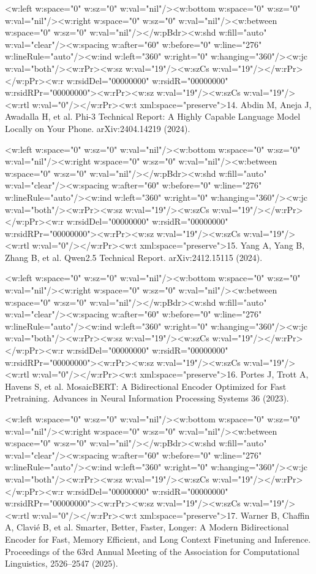 \documentclass[11pt]{article}
\begin{document}
<w:left w:space="0" w:sz="0" w:val="nil"/><w:bottom w:space="0" w:sz="0" w:val="nil"/><w:right w:space="0" w:sz="0" w:val="nil"/><w:between w:space="0" w:sz="0" w:val="nil"/></w:pBdr><w:shd w:fill="auto" w:val="clear"/><w:spacing w:after="60" w:before="0" w:line="276" w:lineRule="auto"/><w:ind w:left="360" w:right="0" w:hanging="360"/><w:jc w:val="both"/><w:rPr><w:sz w:val="19"/><w:szCs w:val="19"/></w:rPr></w:pPr><w:r w:rsidDel="00000000" w:rsidR="00000000" w:rsidRPr="00000000"><w:rPr><w:sz w:val="19"/><w:szCs w:val="19"/><w:rtl w:val="0"/></w:rPr><w:t xml:space="preserve">14. Abdin M, Aneja J, Awadalla H, et al. Phi-3 Technical Report: A Highly Capable Language Model Locally on Your Phone. arXiv:2404.14219 (2024).

<w:left w:space="0" w:sz="0" w:val="nil"/><w:bottom w:space="0" w:sz="0" w:val="nil"/><w:right w:space="0" w:sz="0" w:val="nil"/><w:between w:space="0" w:sz="0" w:val="nil"/></w:pBdr><w:shd w:fill="auto" w:val="clear"/><w:spacing w:after="60" w:before="0" w:line="276" w:lineRule="auto"/><w:ind w:left="360" w:right="0" w:hanging="360"/><w:jc w:val="both"/><w:rPr><w:sz w:val="19"/><w:szCs w:val="19"/></w:rPr></w:pPr><w:r w:rsidDel="00000000" w:rsidR="00000000" w:rsidRPr="00000000"><w:rPr><w:sz w:val="19"/><w:szCs w:val="19"/><w:rtl w:val="0"/></w:rPr><w:t xml:space="preserve">15. Yang A, Yang B, Zhang B, et al. Qwen2.5 Technical Report. arXiv:2412.15115 (2024).

<w:left w:space="0" w:sz="0" w:val="nil"/><w:bottom w:space="0" w:sz="0" w:val="nil"/><w:right w:space="0" w:sz="0" w:val="nil"/><w:between w:space="0" w:sz="0" w:val="nil"/></w:pBdr><w:shd w:fill="auto" w:val="clear"/><w:spacing w:after="60" w:before="0" w:line="276" w:lineRule="auto"/><w:ind w:left="360" w:right="0" w:hanging="360"/><w:jc w:val="both"/><w:rPr><w:sz w:val="19"/><w:szCs w:val="19"/></w:rPr></w:pPr><w:r w:rsidDel="00000000" w:rsidR="00000000" w:rsidRPr="00000000"><w:rPr><w:sz w:val="19"/><w:szCs w:val="19"/><w:rtl w:val="0"/></w:rPr><w:t xml:space="preserve">16. Portes J, Trott A, Havens S, et al. MosaicBERT: A Bidirectional Encoder Optimized for Fast Pretraining. Advances in Neural Information Processing Systems 36 (2023).

<w:left w:space="0" w:sz="0" w:val="nil"/><w:bottom w:space="0" w:sz="0" w:val="nil"/><w:right w:space="0" w:sz="0" w:val="nil"/><w:between w:space="0" w:sz="0" w:val="nil"/></w:pBdr><w:shd w:fill="auto" w:val="clear"/><w:spacing w:after="60" w:before="0" w:line="276" w:lineRule="auto"/><w:ind w:left="360" w:right="0" w:hanging="360"/><w:jc w:val="both"/><w:rPr><w:sz w:val="19"/><w:szCs w:val="19"/></w:rPr></w:pPr><w:r w:rsidDel="00000000" w:rsidR="00000000" w:rsidRPr="00000000"><w:rPr><w:sz w:val="19"/><w:szCs w:val="19"/><w:rtl w:val="0"/></w:rPr><w:t xml:space="preserve">17. Warner B, Chaffin A, Clavié B, et al. Smarter, Better, Faster, Longer: A Modern Bidirectional Encoder for Fast, Memory Efficient, and Long Context Finetuning and Inference. Proceedings of the 63rd Annual Meeting of the Association for Computational Linguistics, 2526–2547 (2025).
\end{document}
